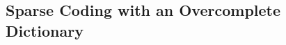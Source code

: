\documentclass[\toplevelprefix/book-main.tex]{subfiles}
\begin{document}
%

\subsection{Sparse Coding with an Overcomplete Dictionary} 
\end{document}
